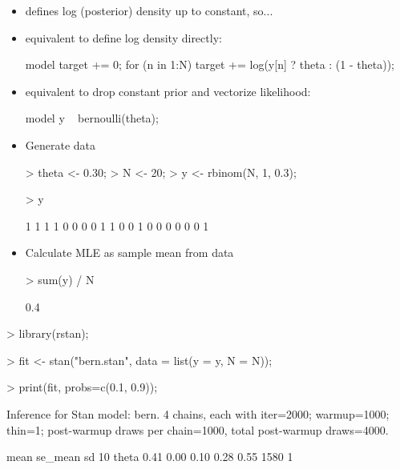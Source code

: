 \documentclass[10pt]{report}
\begin{document}
%
\begin{itemize}
\item defines log (posterior) density up to constant, so...
\item equivalent to define log density directly:
\begin{stancode}
model {
  target += 0;
  for (n in 1:N)
    target += log(y[n] ? theta : (1 - theta));
}
\end{stancode}
\item equivalent to drop constant prior and vectorize
  likelihood: 
\begin{stancode}
model {
  y ~ bernoulli(theta);
}
\end{stancode}
\end{itemize}


%
\begin{itemize}
\item Generate data
\begin{codein}
> theta <- 0.30;
> N <- 20;
> y <- rbinom(N, 1, 0.3);

> y
\end{codein}
\begin{codeout}
 [1] 1 1 1 1 0 0 0 0 1 1 0 0 1 0 0 0 0 0 0 1
\end{codeout}
\item Calculate MLE as sample mean from data
\begin{codein}
> sum(y) / N
\end{codein}
\begin{codeout}
[1] 0.4
\end{codeout}
\end{itemize}


%
\begin{codein}
> library(rstan);

> fit <- stan("bern.stan",
              data = list(y = y, N = N));

> print(fit, probs=c(0.1, 0.9));
\end{codein}
\begin{codeout}
Inference for Stan model: bern.
4 chains, each with iter=2000; warmup=1000; thin=1; 
post-warmup draws per chain=1000,
total post-warmup draws=4000.

        mean se_mean   sd    10%
theta   0.41    0.00 0.10   0.28   0.55  1580    1
\end{codeout}
\end{document}
